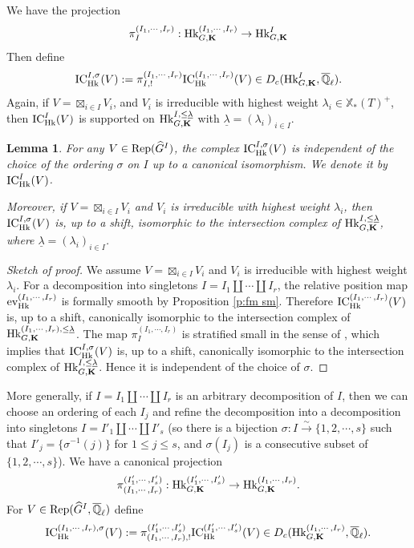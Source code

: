 \documentclass[11pt]{amsart}
\numberwithin{equation}{section}
\theoremstyle{plain}
\newtheorem{lemma}[subsubsection]{Lemma}
\theoremstyle{definition}
\def\QQ{\mathbb{Q}}
\def\bK{\mathbf{K}}
\def\dG{\widehat{G}}
\newcommand\ev{\textup{ev}}
\newcommand{\Hk}{\textup{Hk}}
\newcommand\IC{\textup{IC}}
\newcommand\Rep{\textup{Rep}}
\newcommand\xcoch{\mathbb{X}_*}
\newcommand{\isom}{\stackrel{\sim}{\to}}
\newcommand{\Qlbar}{\overline{\QQ}_\ell}
\newcommand\un{\underline}
\newcommand{\s}{\sigma}
\renewcommand{\l}{\lambda}
\begin{document}
We have the projection
\begin{equation*}
\pi^{(I_{1},\cdots, I_{r})}_{I}: \Hk^{(I_{1},\cdots, I_{r})}_{G,\bK}\to \Hk^{I}_{G,\bK}
\end{equation*}
Then define
\begin{equation*}
\IC^{I,\s}_{\Hk}(V):=\pi^{(I_{1},\cdots, I_{r})}_{I, !}\IC^{(I_{1},\cdots, I_{r})}_{\Hk}(V)\in D_{c}(\Hk^{I}_{G,\bK}, \Qlbar).
\end{equation*}
Again, if $V=\boxtimes_{i\in I}V_{i}$, and $V_{i}$ is irreducible with highest weight $\l_{i}\in\xcoch(T)^{+}$, then $\IC^{I}_{\Hk}(V)$ is supported on  $\Hk^{I, \le\un\l}_{G,\bK}$ with $\un\l=(\l_{i})_{i\in I}$.

\begin{lemma}\label{l:IC Hk}
For any $V\in \Rep(\dG^{I})$, the complex $\IC^{I,\s}_{\Hk}(V)$ is independent of the choice of the ordering $\s$ on $I$ up to a canonical isomorphism. We denote it by $\IC^{I}_{\Hk}(V)$.

Moreover, if $V=\boxtimes_{i\in I}V_{i}$ and  $V_{i}$ is irreducible with highest weight $\l_{i}$, then $\IC^{I,\s}_{\Hk}(V)$ is, up to a shift, isomorphic to the intersection complex of $\Hk^{I, \le\un\l}_{G,\bK}$, where $\un\l=(\l_{i})_{i\in I}$.
\end{lemma}
\begin{proof}[Sketch of proof] We assume $V=\boxtimes_{i\in I}V_{i}$ and $V_{i}$ is irreducible with highest weight $\l_{i}$. For a decomposition into singletons $I=I_{1}\coprod\cdots\coprod I_{r}$, the relative position map $\ev^{(I_{1},\cdots, I_{r})}_{\Hk}$ is formally smooth by Proposition \ref{p:fm sm}. Therefore $\IC^{(I_{1},\cdots, I_{r})}_{\Hk}(V)$ is, up to a shift, canonically isomorphic to the intersection complex of $\Hk^{(I_{1},\cdots, I_{r}), \le\un\l}_{G,\bK}$. The map $\pi^{(I_{1},\cdots, I_{r})}_{I}$ is stratified small in the sense of \cite[after Prop. 4.2]{MV}, which implies that $\IC^{I,\s}_{\Hk}(V)$ is, up to a shift, canonically isomorphic to the intersection complex of $\Hk^{I, \le\un\l}_{G,\bK}$. Hence it is independent of the choice of $\s$.
\end{proof}

More generally, if $I=I_{1}\coprod\cdots \coprod I_{r}$ is an arbitrary decomposition of $I$, then we can choose an ordering of each $I_{j}$ and refine the decomposition into a decomposition into singletons $I=I'_{1}\coprod\cdots \coprod I'_{s}$ (so there is a bijection $\s: I\isom \{1,2,\cdots, s\}$ such that $I'_{j}=\{\s^{-1}(j)\}$ for $1\le j\le s$, and $\s(I_{j})$ is a consecutive subset of $\{1,2,\cdots, s\}$). We have a canonical projection
\begin{equation*}
\pi^{(I'_{1},\cdots, I'_{s})}_{(I_{1},\cdots, I_{r})}: \Hk^{(I'_{1},\cdots, I'_{s})}_{G,\bK}\to \Hk^{(I_{1},\cdots, I_{r})}_{G,\bK}.
\end{equation*}
For $V\in \Rep(\dG^{I}, \Qlbar)$ define
\begin{equation*}
\IC^{(I_{1},\cdots, I_{r}),\s}_{\Hk}(V):=\pi^{(I'_{1},\cdots, I'_{s})}_{(I_{1},\cdots, I_{r}), !}\IC^{(I'_{1},\cdots, I'_{s})}_{\Hk}(V)\in D_{c}(\Hk^{(I_{1},\cdots, I_{r})}_{G,\bK}, \Qlbar).
\end{equation*}
\end{document}
